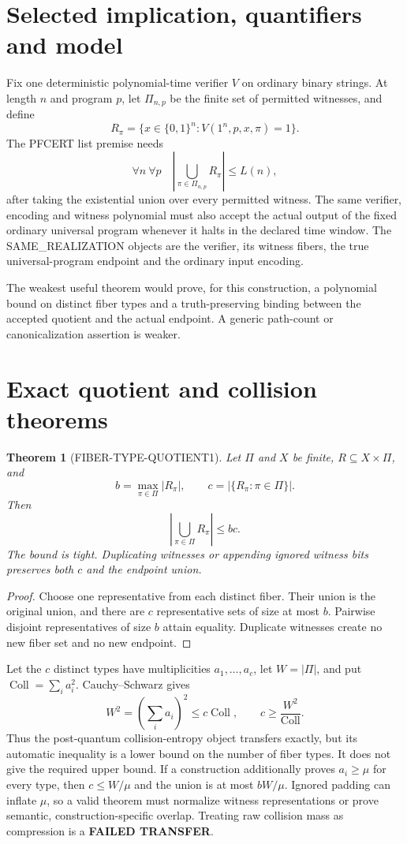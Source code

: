 \documentclass[11pt]{article}
\newtheorem{theorem}{Theorem}
\begin{document}
\section{Selected implication, quantifiers and model}
Fix one deterministic polynomial-time verifier $V$ on ordinary binary
strings.  At length $n$ and program $p$, let $\Pi_{n,p}$ be the finite set
of permitted witnesses, and define
\[
 R_\pi=\{x\in\{0,1\}^n:V(1^n,p,x,\pi)=1\}.
\]
The PFCERT list premise needs
\[
 \forall n\ \forall p\quad
 \left|\bigcup_{\pi\in\Pi_{n,p}}R_\pi\right|\le L(n),
\]
after taking the existential union over every permitted witness.  The same
verifier, encoding and witness polynomial must also accept the actual output
of the fixed ordinary universal program whenever it halts in the declared
time window.  The SAME\_REALIZATION objects are the verifier, its witness
fibers, the true universal-program endpoint and the ordinary input encoding.

The weakest useful theorem would prove, for this construction, a polynomial
bound on distinct fiber types and a truth-preserving binding between the
accepted quotient and the actual endpoint.  A generic path-count or
canonicalization assertion is weaker.

\section{Exact quotient and collision theorems}
\begin{theorem}[FIBER-TYPE-QUOTIENT1]
Let $\Pi$ and $X$ be finite, $R\subseteq X\times\Pi$, and
\[
 b=\max_{\pi\in\Pi}|R_\pi|,
 \qquad
 c=\bigl|\{R_\pi:\pi\in\Pi\}\bigr|.
\]
Then
\[
 \left|\bigcup_{\pi\in\Pi}R_\pi\right|\le bc.
\]
The bound is tight.  Duplicating witnesses or appending ignored witness bits
preserves both $c$ and the endpoint union.
\end{theorem}
\begin{proof}
Choose one representative from each distinct fiber.  Their union is the
original union, and there are $c$ representative sets of size at most $b$.
Pairwise disjoint representatives of size $b$ attain equality.  Duplicate
witnesses create no new fiber set and no new endpoint.
\end{proof}

Let the $c$ distinct types have multiplicities $a_1,\ldots,a_c$, let
$W=|\Pi|$, and put $\operatorname{Coll}=\sum_i a_i^2$.
Cauchy--Schwarz gives
\[
 W^2=\left(\sum_i a_i\right)^2\le c\operatorname{Coll},
 \qquad
 c\ge\frac{W^2}{\operatorname{Coll}}.
\]
Thus the post-quantum collision-entropy object transfers exactly, but its
automatic inequality is a lower bound on the number of fiber types.  It
does not give the required upper bound.  If a construction additionally
proves $a_i\ge\mu$ for every type, then $c\le W/\mu$ and the union is at
most $bW/\mu$.  Ignored padding can inflate $\mu$, so a valid theorem must
normalize witness representations or prove semantic, construction-specific
overlap.  Treating raw collision mass as compression is a \textbf{FAILED
TRANSFER}.
\end{document}
